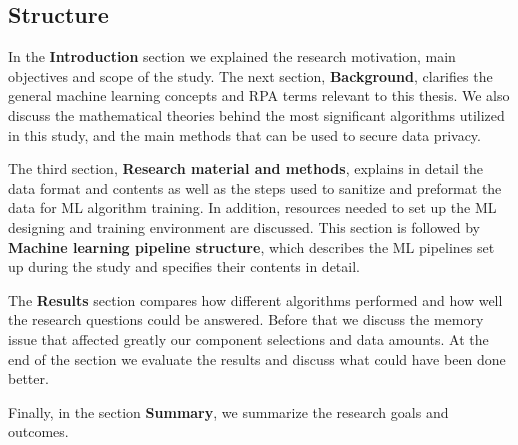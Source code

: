 
\subsection{Structure}\label{subsec:intro-structure}

In the \textbf{Introduction} section
we explained the research motivation,
main objectives and scope of the study.
The next section, \textbf{Background},
clarifies the general machine learning concepts
and RPA terms relevant to this thesis.
We also discuss the mathematical theories
behind the most significant algorithms utilized in this study,
and the main methods that can be used to secure data privacy.

The third section,
\textbf{Research material and methods},
explains in detail the data format and contents
as well as the steps used to sanitize and preformat the data
for ML algorithm training.
In addition,
resources needed to set up the ML designing and training environment
are discussed.
This section is followed by \textbf{Machine learning pipeline structure},
which describes the ML pipelines set up during the study
and specifies their contents in detail.

The \textbf{Results} section compares how different algorithms performed
and how well the research questions could be answered.
Before that we discuss the memory issue
that affected greatly our component selections and data amounts.
At the end of the section we evaluate the results
and discuss what could have been done better.

Finally,
in the section \textbf{Summary},
we summarize the research goals and outcomes.

\clearpage
